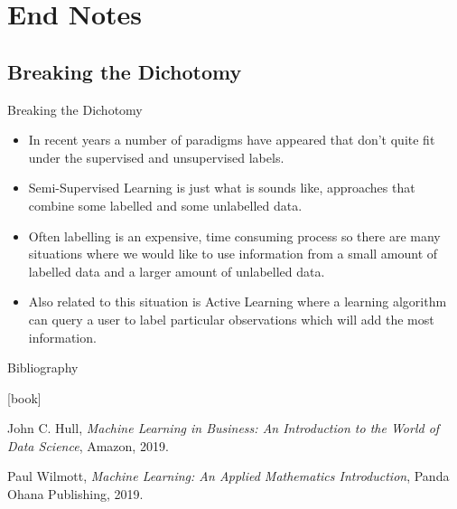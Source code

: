 \documentclass[11pt]{beamer}
\begin{document}
\section{End Notes}
\subsection{Breaking the Dichotomy}
\begin{frame}{Breaking the Dichotomy}
\begin{itemize}
\item In recent years a number of paradigms have appeared that don’t quite fit under the supervised and unsupervised labels. 

\item Semi-Supervised Learning is just what is sounds like, approaches that combine some labelled and some unlabelled data. 

\item Often labelling is an expensive, time consuming process so there are many situations where we would like to use information from a small amount of labelled data and a larger amount of unlabelled data. 

\item Also related to this situation is Active Learning where a learning algorithm can query a user to label particular observations which will add the most information. 
\end{itemize}
\end{frame}

\begin{frame}{Bibliography}
\begin{thebibliography}{9}

[book]

 John C. Hull, \textit{Machine Learning in Business: An Introduction to the World of Data Science}, Amazon, 2019.

 Paul Wilmott, \textit{Machine Learning: An Applied Mathematics Introduction}, Panda Ohana Publishing, 2019.

\end{thebibliography}
\end{frame}
\end{document}
